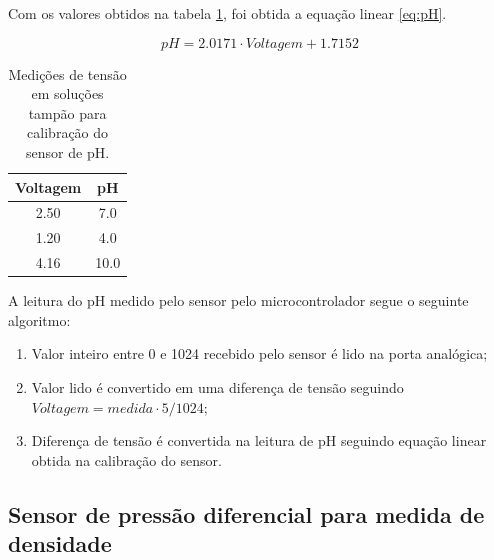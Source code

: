Com os valores obtidos na tabela \ref{tab:calibra_ph}, foi obtida a equação linear \ref{eq:pH}.

\begin{equation}
    pH = 2.0171 \cdot Voltagem + 1.7152
    \label{eq:pH}
\end{equation}


\begin{table}[H]
    \begin{center}
        \begin{tabular}{ |c|c| } 
            \hline
            Voltagem & pH \\
            \hline
            2.50 & 7.0 \\ 
            \hline
            1.20 & 4.0 \\ 
            \hline
            4.16 & 10.0 \\ 
            \hline
        \end{tabular}
        \caption{\label{tab:calibra_ph}Medições de tensão em soluções tampão para calibração do sensor de pH.}
    \end{center}
\end{table}


A leitura do pH medido pelo sensor pelo microcontrolador segue o seguinte algoritmo:
\begin{enumerate}
    \item Valor inteiro entre 0 e 1024 recebido pelo sensor é lido na porta analógica;
    \item Valor lido é convertido em uma diferença de tensão seguindo \(Voltagem = medida \cdot 5 / 1024\);
    \item Diferença de tensão é convertida na leitura de pH seguindo equação linear obtida na calibração do sensor.
\end{enumerate}






\subsection{Sensor de pressão diferencial para medida de densidade}

